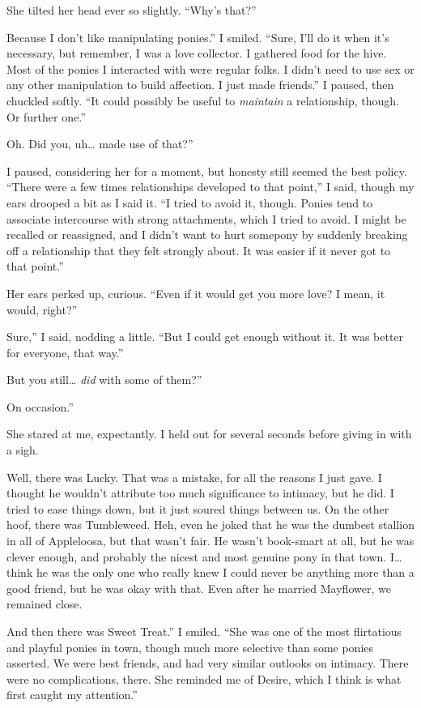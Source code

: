She tilted her head ever so slightly. “Why’s that?”

\leavevmode{}Because I don’t like manipulating ponies.” I smiled. “Sure, I’ll do it when it’s necessary, but remember, I was a love collector. I gathered food for the hive. Most of the ponies I interacted with were regular folks. I didn’t need to use sex or any other manipulation to build affection. I just made friends.” I paused, then chuckled softly. “It could possibly be useful to \textit{maintain} a relationship, though. Or further one.”

\leavevmode{}Oh. Did you, uh… made use of that?”

I paused, considering her for a moment, but honesty still seemed the best policy. “There were a few times relationships developed to that point,” I said, though my ears drooped a bit as I said it. “I tried to avoid it, though. Ponies tend to associate intercourse with strong attachments, which I tried to avoid. I might be recalled or reassigned, and I didn’t want to hurt somepony by suddenly breaking off a relationship that they felt strongly about. It was easier if it never got to that point.”

Her ears perked up, curious. “Even if it would get you more love? I mean, it would, right?”

\leavevmode{}Sure,” I said, nodding a little. “But I could get enough without it. It was better for everyone, that way.”

\leavevmode{}But you still… \textit{did} with some of them?”

\leavevmode{}On occasion.”

She stared at me, expectantly. I held out for several seconds before giving in with a sigh.

\leavevmode{}Well, there was Lucky. That was a mistake, for all the reasons I just gave. I thought he wouldn’t attribute too much significance to intimacy, but he did. I tried to ease things down, but it just soured things between us. On the other hoof, there was Tumbleweed. Heh, even he joked that he was the dumbest stallion in all of Appleloosa, but that wasn’t fair. He wasn’t book-smart at all, but he was clever enough, and probably the nicest and most genuine pony in that town. I… think he was the only one who really knew I could never be anything more than a good friend, but he was okay with that. Even after he married Mayflower, we remained close.

\leavevmode{}And then there was Sweet Treat.” I smiled. “She was one of the most flirtatious and playful ponies in town, though much more selective than some ponies asserted. We were best friends, and had very similar outlooks on intimacy. There were no complications, there. She reminded me of Desire, which I think is what first caught my attention.”

